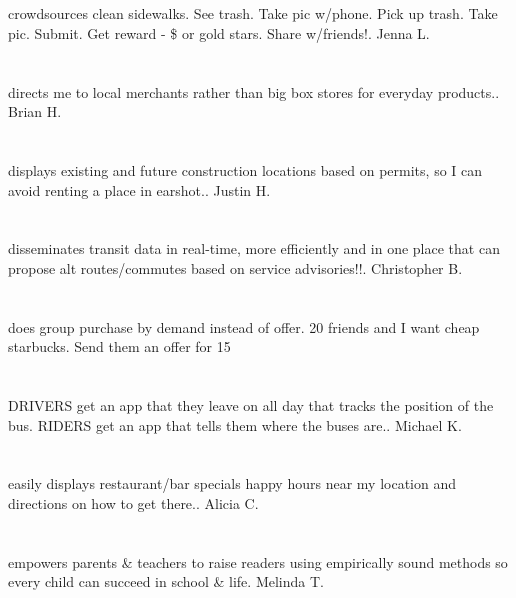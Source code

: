\section{}crowdsources clean sidewalks. See trash. Take pic w/phone. Pick up trash. Take pic. Submit. Get reward - \$ or gold stars. Share w/friends!. Jenna L.
\section{}directs me to local merchants rather than big box stores for everyday products.. Brian H.
\section{}displays existing and future construction locations based on permits,  so I can avoid renting a place in earshot.. Justin H.
\section{}disseminates transit data in real-time,  more efficiently and in one place that can propose alt routes/commutes based on service advisories!!. Christopher B.
\section{}does group purchase by demand instead of offer. 20 friends and I want cheap starbucks. Send them an offer for 15%
\section{}DRIVERS get an app that they leave on all day that tracks the position of the bus. RIDERS get an app that tells them where the buses are.. Michael K.
\section{}easily displays restaurant/bar specials happy hours near my location and directions on how to get there.. Alicia C.
\section{}empowers parents \& teachers to raise readers using empirically sound methods so every child can succeed in school  \& life. Melinda T.
